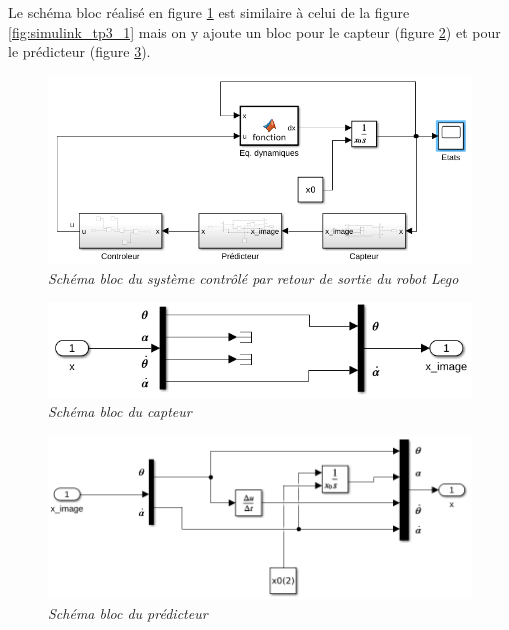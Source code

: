 \documentclass[11pt,french]{article} %
\begin{document}
\quad Le schéma bloc réalisé en figure \ref{fig:simulink_tp3_2_systeme} est similaire à celui de la figure \ref{fig:simulink_tp3_1} mais on y ajoute un bloc pour le capteur (figure \ref{fig:simulink_tp3_2_capteur}) et pour le prédicteur (figure \ref{fig:simulink_tp3_2_predicteur}). \\

\begin{figure}[H]
    \centering
    \includegraphics[width=12cm]{simulink_tp3_2_systeme.png} 
		\caption{\textit{Schéma bloc du système contrôlé par retour de sortie du robot Lego}}
		\label{fig:simulink_tp3_2_systeme}
\end{figure}
\vspace{0.5cm}

\begin{figure}[H]
    \centering
    \includegraphics[width=12cm]{simulink_tp3_2_capteur.png} 
		\caption{\textit{Schéma bloc du capteur}}
		\label{fig:simulink_tp3_2_capteur}
\end{figure}
\vspace{0.5cm}

\begin{figure}[H]
    \centering
    \includegraphics[width=12cm]{simulink_tp3_2_predicteur.png} 
		\caption{\textit{Schéma bloc du prédicteur}}
		\label{fig:simulink_tp3_2_predicteur}
\end{figure}
\vspace{0.5cm}
\end{document}
